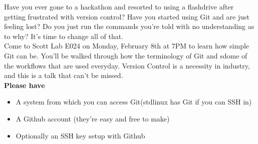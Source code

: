 \documentclass[12pt]{article}
\begin{document}
	\maketitle\noindent
	Have you ever gone to a hackathon and resorted to using a flashdrive after getting frustrated with version control? Have you started using Git and are just feeling lost? Do you just run the commands you're told with no understanding as to why? It's time to change all of that.\\
	\linebreak
	Come to Scott Lab E024 on Monday, February 8th at 7PM to learn how simple Git can be. You'll be walked through how the terminology of Git and sdome of the workflows that are used everyday. Version Control is a necessity in industry, and this is a talk that can't be missed.\\
	\linebreak
		\textbf{Please have}\\
		\begin{itemize}
			\item A system from which you can access Git(stdlinux has Git if you can SSH in)
			\item A Github account (they're easy and free to make)
			\item Optionally an SSH key setup with Github
		\end{itemize}
\end{document}
